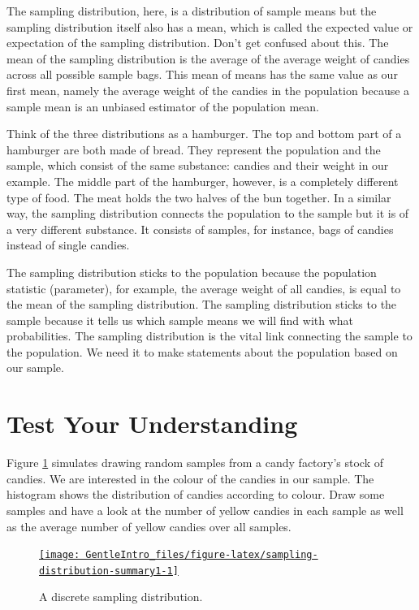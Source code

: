 \documentclass[a4paper]{book}
\theoremstyle{definition}
\theoremstyle{definition}
\theoremstyle{definition}
\theoremstyle{remark}
\begin{document}
The sampling distribution, here, is a distribution of sample means but
the sampling distribution itself also has a mean, which is called the
expected value or expectation of the sampling distribution. Don't get
confused about this. The mean of the sampling distribution is the
average of the average weight of candies across all possible sample
bags. This mean of means has the same value as our first mean, namely
the average weight of the candies in the population because a sample
mean is an unbiased estimator of the population mean.

Think of the three distributions as a hamburger. The top and bottom part
of a hamburger are both made of bread. They represent the population and
the sample, which consist of the same substance: candies and their
weight in our example. The middle part of the hamburger, however, is a
completely different type of food. The meat holds the two halves of the
bun together. In a similar way, the sampling distribution connects the
population to the sample but it is of a very different substance. It
consists of samples, for instance, bags of candies instead of single
candies.

The sampling distribution sticks to the population because the
population statistic (parameter), for example, the average weight of all
candies, is equal to the mean of the sampling distribution. The sampling
distribution sticks to the sample because it tells us which sample means
we will find with what probabilities. The sampling distribution is the
vital link connecting the sample to the population. We need it to make
statements about the population based on our sample.

\section{Test Your Understanding}\label{test-your-understanding}

Figure \ref{fig:sampling-distribution-summary1} simulates drawing random
samples from a candy factory's stock of candies. We are interested in
the colour of the candies in our sample. The histogram shows the
distribution of candies according to colour. Draw some samples and have
a look at the number of yellow candies in each sample as well as the
average number of yellow candies over all samples.

\begin{figure}[H]
\href{http://82.196.4.233:3838/apps/sampling-distribution/}{\texttt{[image: GentleIntro\_files/figure-latex/sampling-distribution-summary1-1]} }\caption{A discrete sampling distribution.}\label{fig:sampling-distribution-summary1}
\end{figure}
\end{document}
